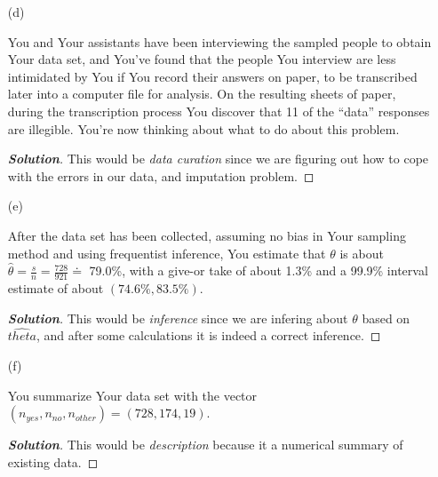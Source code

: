 \documentclass[12pt]{article}
\newenvironment{solution}{\begin{proof}[\textbf{\textit{Solution}}] }{\end{proof}}
\begin{document}
\begin{itemize}
\begin{itemize}
\vspace*{0.6in}

\item[(d)]

You and Your assistants have been interviewing the sampled people to obtain Your data set, and You've found that the people You interview are less intimidated by You if You record their answers on paper, to be transcribed later into a computer file for analysis. On the resulting sheets of paper, during the transcription process You discover that 11 of the ``data'' responses are illegible. You're now thinking about what to do about this problem.

\begin{tcolorbox}
    \begin{solution}
        This would be \textit{data curation} since we are figuring out how to cope with the errors in our data, and imputation problem.  
    \end{solution}
\end{tcolorbox}

\vspace*{0.6in}
\newpage
\item[(e)]

After the data set has been collected, assuming no bias in Your sampling method and using frequentist inference, You estimate that $\theta$ is about $\hat{ \theta } = \frac{ s }{ n } = \frac{ 728 }{ 921 } \doteq$ 79.0\%, with a give-or take of about 1.3\% and a 99.9\% interval estimate of about $( 74.6\%, 83.5\% )$.

\begin{tcolorbox}
    \begin{solution}
        This would be \textit{inference} since we are infering about $\theta$ based on $\hat{theta}$, and after some calculations it is indeed a correct inference. 
    \end{solution}
\end{tcolorbox}

\vspace*{0.6in}

\item[(f)]

You summarize Your data set with the vector $( n_{ yes }, n_{ no }, n_{ other } ) = ( 728, 174, 19 )$.
\begin{tcolorbox}
    \begin{solution}
        This would be \textit{description} because it a numerical summary of existing data. 
    \end{solution}
\end{tcolorbox}
\vspace*{0.6in}


\end{itemize}
\end{itemize}
\end{document}
